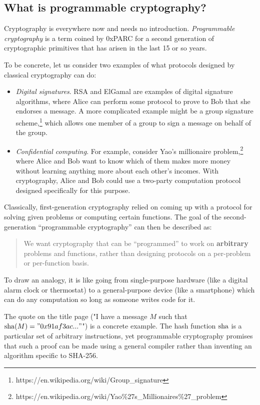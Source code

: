 \subsection{What is programmable cryptography?}

Cryptography is everywhere now and needs no introduction.
\emph{Programmable cryptography} is a term coined by 0xPARC for a second
generation of cryptographic primitives that has arisen in the last 15 or
so years.

To be concrete, let us consider two examples of what protocols designed
by classical cryptography can do:

\begin{itemize}
\item
  \emph{Digital signatures}. RSA and ElGamal are examples of digital
  signature algorithms, where Alice can perform some protocol to prove
  to Bob that she endorses a message. A more complicated example might
  be a group signature scheme,\footnote{https://en.wikipedia.org/wiki/Group\_signature}
  which allows one member of a group to sign a message on behalf of the
  group.
\item
  \emph{Confidential computing}. For example, consider
  Yao's millionaire problem,\footnote{https://en.wikipedia.org/wiki/Yao\%27s\_Millionaires\%27\_problem}
  where Alice and Bob want to know which of them makes more money
  without learning anything more about each other's incomes. With
  cryptography, Alice and Bob could use a two-party computation protocol
  designed specifically for this purpose.
\end{itemize}

Classically, first-generation cryptography relied on coming up with a
protocol for solving given problems or computing certain functions. The
goal of the second-generation ``programmable cryptography'' can then be
described as:

\begin{quote}
We want cryptography that can be ``programmed'' to work on
\textbf{arbitrary} problems and functions, rather than designing
protocols on a per-problem or per-function basis.
\end{quote}

To draw an analogy, it is like going from single-purpose hardware (like
a digital alarm clock or thermostat) to a general-purpose device (like a
smartphone) which can do any computation so long as someone writes code
for it.

\begin{remark}
The quote on the title page
("I have a message $M$ such that $\operatorname{sha}(M) = "0x91af3ac..."$")
is a concrete example.
The hash function $\operatorname{sha}$ is a particular set of arbitrary instructions,
yet programmable cryptography promises that such a proof can be made
using a general compiler rather than inventing an algorithm specific to SHA-256.
\end{remark}

